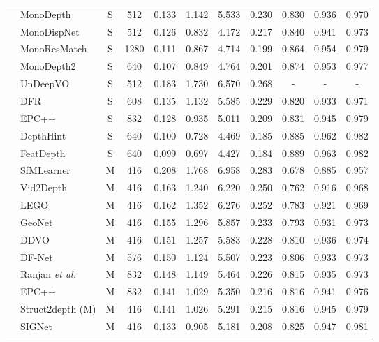 \documentclass[runningheads]{llncs}
\newcommand{\etal}{\textit{et al.}}
\begin{document}
\begin{center}
\begin{table*}[t]
{\begin{tabular}{|l|l|c|c||a|c|c|c|c|c|c|}
&MonoDepth~\cite{monodepth}         &S &512 &0.133 &1.142 &5.533 &0.230 &0.830 &0.936 &0.970\\
&MonoDispNet~\cite{monodispnet}     &S &512 &0.126 &0.832 &4.172 &0.217 &0.840 &0.941 &0.973\\
&MonoResMatch~\cite{monoresmatch}   &S &1280 &0.111 &0.867 &4.714 &0.199 &0.864 &0.954 &0.979\\
&MonoDepth2~\cite{monodepth2}       &S &640 &0.107 &0.849 &4.764 &0.201 &0.874 &0.953 &0.977\\
&UnDeepVO~\cite{undeepvo}           &S &512 &0.183 &1.730 &6.570 &0.268 &- &- &-\\
&DFR~\cite{dfr}                     &S &608 &0.135 &1.132 &5.585 &0.229 &0.820 &0.933 &0.971\\
&EPC++~\cite{luo2019every}          &S & 832 &0.128 &0.935 &5.011 &0.209 &0.831 &0.945 &0.979\\
&DepthHint~\cite{depthhint}         &S &640 &0.100 &0.728 &4.469 &0.185 &0.885 &0.962 &0.982\\ 
&FeatDepth~\cite{featdepth}        &S &640 &0.099 &0.697 &4.427 &0.184 &0.889 &0.963 &0.982\\
& SfMLearner~\cite{zhou2017unsupervised}&M &416 &0.208 &1.768 &6.958 &0.283 &0.678 &0.885 &0.957\\
& Vid2Depth~\cite{mahjourian2018unsupervised}          &M &416 &0.163 &1.240 &6.220 &0.250 &0.762 &0.916 &0.968\\
& LEGO~\cite{lego}                   &M &416 &0.162 &1.352 &6.276 &0.252 &0.783 &0.921 &0.969\\
& GeoNet~\cite{geonet2018}           &M &416 &0.155 &1.296 &5.857 &0.233 &0.793 &0.931 &0.973\\
& DDVO~\cite{ddvo}                   &M &416 &0.151 &1.257 &5.583 &0.228 &0.810 &0.936 &0.974\\
& DF-Net~\cite{dfnet}                &M &576 &0.150 &1.124 &5.507 &0.223 &0.806 &0.933 &0.973\\
& Ranjan \etal \cite{ranjan2018adversarial}   & M & 832 & 0.148 & 1.149 & 5.464 & 0.226 & 0.815 & 0.935 & 0.973\\
&  EPC++ \cite{luo2019every}                  & M  & 832 & 0.141 & 1.029 & 5.350 & 0.216 & 0.816 & 0.941 & 0.976\\
&  Struct2depth (M) \cite{casser2018depth}    & M   &416& 0.141 & 1.026 & 5.291 &  0.215 & 0.816 & 0.945 & {0.979}\\
&SIGNet~\cite{signet}                         & M & 416 &0.133 &0.905 &5.181 &0.208 &0.825 &0.947 &0.981\\

\end{tabular}}
\end{table*}
\end{center}
\end{document}

